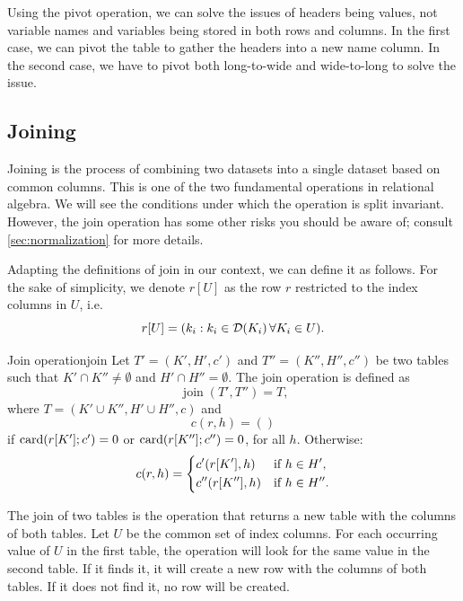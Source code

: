 Using the pivot operation, we can solve the issues of headers being values, not variable
names and variables being stored in both rows and columns.  In the first case, we can pivot
the table to gather the headers into a new name column.  In the second
case, we have to pivot both long-to-wide and wide-to-long to solve the issue.

\subsection{Joining}

Joining is the process of combining two datasets into a single dataset based on common
columns.  This is one of the two fundamental operations in relational algebra. We will see
the conditions under which the operation is split invariant. However, the join operation
has some other risks you should be aware of; consult \cref{sec:normalization} for more
details.

Adapting the definitions of join in our context, we can define it as follows.
For the sake of simplicity, we denote $r[U]$ as the row $r$ restricted to the index
columns in $U$, i.e.
\begin{equation*}
  r[U] = (k_i : k_i \in \domainof{K_i} \forall K_i \in U)\text{.}
\end{equation*}

\begin{defbox}{Join operation}{join}
  Let $T' = (K', H', c')$ and $T'' = (K'', H'', c'')$ be two tables such that $K'
  \cap K'' \neq \emptyset$ and $H' \cap H'' = \emptyset$.  The join operation is
  defined as \[
    \operatorname{join}(T', T'') = T\text{,}
  \] where $T = (K' \cup K'', H' \cup H'', c)$ and \[
    c(r, h) = ()
  \] if $\rowcard[{r[K']; c'}] = 0$ or $\rowcard[{r[K'']; c''}] = 0$, for all $h$.
  Otherwise: \[
    c(r, h) = \begin{dcases}
      c'(r[K'], h) & \text{if } h \in H'\text{,} \\
      c''(r[K''], h) & \text{if } h \in H''\text{.}
    \end{dcases}
  \]
\end{defbox}

The join of two tables is the operation that returns a new table with the columns of both
tables.  Let $U$ be the common set of index columns.  For each occurring value of $U$ in
the first table, the operation will look for the same value in the second table.  If it
finds it, it will create a new row with the columns of both tables.  If it does not find
it, no row will be created.

